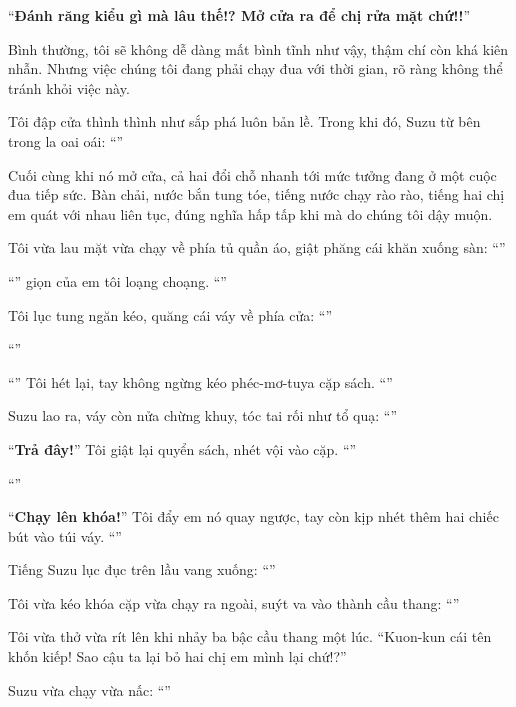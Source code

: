 \documentclass[../main.tex]{subfiles}
\begin{document}
``\textbf{Đánh răng kiểu gì mà lâu thế!? Mở cửa ra để chị rửa mặt chứ!!}''

Bình thường, tôi sẽ không dễ dàng mất bình tĩnh như vậy, thậm chí còn khá kiên nhẫn. Nhưng việc chúng tôi đang phải chạy đua với thời gian, rõ ràng không thể tránh khỏi việc này.

Tôi đập cửa thình thình như sắp phá luôn bản lề. Trong khi đó, Suzu từ bên trong la oai oái: ``\textbf{}''

Cuối cùng khi nó mở cửa, cả hai đổi chỗ nhanh tới mức tưởng đang ở một cuộc đua tiếp sức. Bàn chải, nước bắn tung tóe, tiếng nước chạy rào rào, tiếng hai chị em quát với nhau liên tục, đúng nghĩa hấp tấp khi mà do chúng tôi dậy muộn.

Tôi vừa lau mặt vừa chạy về phía tủ quần áo, giật phăng cái khăn xuống sàn: ``''

``'' giọn của em tôi loạng choạng. ``''

Tôi lục tung ngăn kéo, quăng cái váy về phía cửa: ``''

``''

``\textbf{}'' Tôi hét lại, tay không ngừng kéo phéc-mơ-tuya cặp sách. ``''

Suzu lao ra, váy còn nửa chừng khuy, tóc tai rối như tổ quạ: ``''

``\textbf{Trả đây!}'' Tôi giật lại quyển sách, nhét vội vào cặp. ``''

``''

``\textbf{Chạy lên khóa!}'' Tôi đẩy em nó quay ngược, tay còn kịp nhét thêm hai chiếc bút vào túi váy. ``''

Tiếng Suzu lục đục trên lầu vang xuống: ``''

Tôi vừa kéo khóa cặp vừa chạy ra ngoài, suýt va vào thành cầu thang: ``''

Tôi vừa thở vừa rít lên khi nhảy ba bậc cầu thang một lúc. ``Kuon-kun cái tên khốn kiếp! Sao cậu ta lại bỏ hai chị em mình lại chứ!?''

Suzu vừa chạy vừa nấc: ``''
\end{document}
